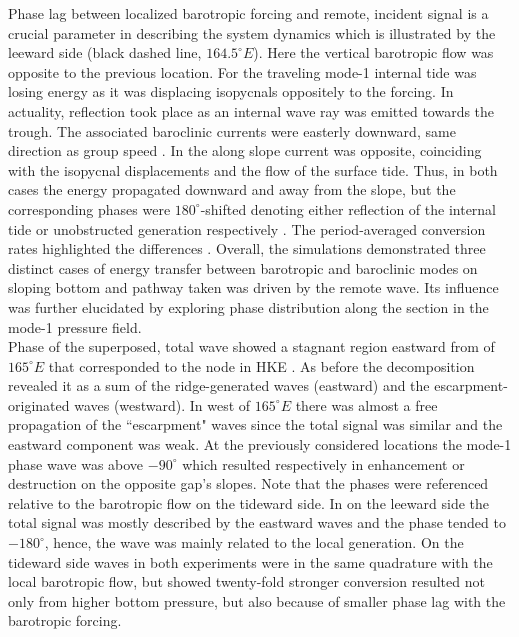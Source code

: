 \documentclass[12pt]{article}
\begin{document}
Phase lag between localized barotropic forcing and remote, incident signal is a 
crucial parameter in describing the system dynamics which is illustrated by the leeward side (black 
dashed line, $164.5^{\circ}E$). Here the vertical barotropic flow was opposite to the previous 
location. For  the traveling mode-1 internal tide was losing energy as it was 
displacing 
isopycnals oppositely to the forcing. In actuality, reflection took place as an internal 
wave ray was emitted towards the trough. The associated baroclinic currents were easterly downward, 
same direction as group speed . In  the along slope current 
was opposite, coinciding with the isopycnal displacements and the flow of the surface tide. 
Thus, in both cases the energy propagated downward and away from the slope, but the corresponding 
phases were $180^{\circ}$-shifted denoting either reflection of the internal tide or unobstructed 
generation respectively . The period-averaged conversion rates highlighted 
the differences . Overall, the simulations demonstrated three distinct 
cases of energy transfer between barotropic and baroclinic modes on sloping bottom and pathway 
taken was driven by the remote wave. Its influence was further elucidated by exploring phase 
distribution along the section  in the mode-1 pressure field.\\

Phase of the superposed, total wave showed a stagnant region eastward from of $165^{\circ}E$ that 
corresponded to the node in HKE . As before the decomposition 
revealed it as a sum of the ridge-generated waves (eastward) and the escarpment-originated waves 
(westward). In  west of $165^{\circ}E$ there was almost a free propagation of the 
``escarpment" waves since the total signal was similar and the eastward component was weak. At the 
previously considered locations the mode-1 phase wave was above $-90^{\circ}$ which 
resulted respectively in enhancement or destruction on the opposite gap's slopes. Note that the 
phases were referenced relative to the barotropic flow on the tideward side. In  on the 
leeward side the total signal was mostly described by the eastward waves and the phase tended to 
$-180^{\circ}$, hence, the wave was mainly related to the local generation. On the tideward side 
waves in both experiments were in the same quadrature with the local barotropic flow, but 
 showed twenty-fold stronger conversion resulted not only from higher bottom 
pressure, but also because of smaller phase lag with the barotropic forcing.
\end{document}
